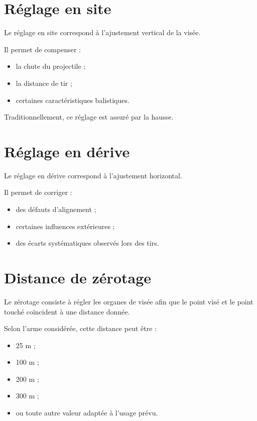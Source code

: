 \section{Réglage en site}

Le réglage en site correspond à l'ajustement vertical de la visée.

Il permet de compenser :

\begin{itemize}
    \item la chute du projectile ;
    \item la distance de tir ;
    \item certaines caractéristiques balistiques.
\end{itemize}

Traditionnellement, ce réglage est assuré par la hausse.

\section{Réglage en dérive}

Le réglage en dérive correspond à l'ajustement horizontal.

Il permet de corriger :

\begin{itemize}
    \item des défauts d'alignement ;
    \item certaines influences extérieures ;
    \item des écarts systématiques observés lors des tirs.
\end{itemize}

\section{Distance de zérotage}

Le zérotage consiste à régler les organes de visée afin que le point visé et
le point touché coïncident à une distance donnée.

Selon l'arme considérée, cette distance peut être :

\begin{itemize}
    \item 25 m ;
    \item 100 m ;
    \item 200 m ;
    \item 300 m ;
    \item ou toute autre valeur adaptée à l'usage prévu.
\end{itemize}

